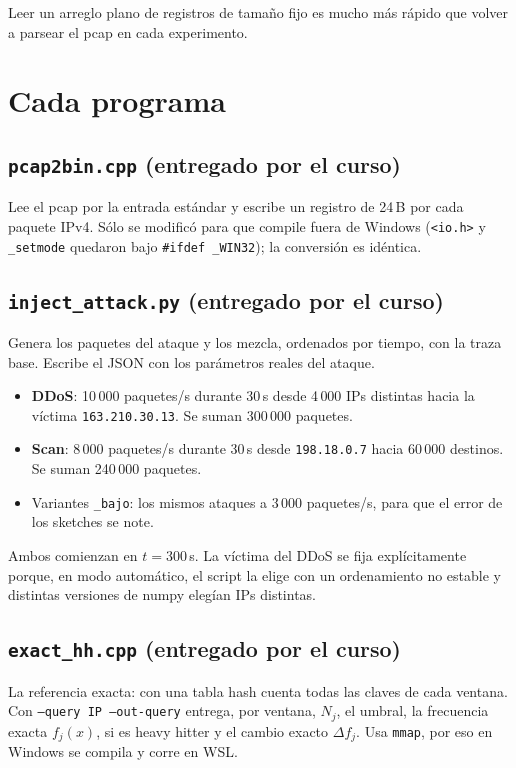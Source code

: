 \documentclass[11pt]{article}
\newcommand{\code}[1]{\texttt{#1}}
\begin{document}
Leer un arreglo plano de registros de tamaño fijo es mucho más rápido que volver a parsear el pcap en cada experimento.

\section{Cada programa}

\subsection{\code{pcap2bin.cpp} (entregado por el curso)}
Lee el pcap por la entrada estándar y escribe un registro de 24\,B por cada paquete IPv4. Sólo se modificó para que compile fuera de Windows (\code{<io.h>} y \code{\_setmode} quedaron bajo \code{\#ifdef \_WIN32}); la conversión es idéntica.

\subsection{\code{inject\_attack.py} (entregado por el curso)}
Genera los paquetes del ataque y los mezcla, ordenados por tiempo, con la traza base. Escribe el JSON con los parámetros reales del ataque.
\begin{itemize}
    \item \textbf{DDoS}: 10\,000 paquetes/s durante 30\,s desde 4\,000 IPs distintas hacia la víctima \code{163.210.30.13}. Se suman 300\,000 paquetes.
    \item \textbf{Scan}: 8\,000 paquetes/s durante 30\,s desde \code{198.18.0.7} hacia 60\,000 destinos. Se suman 240\,000 paquetes.
    \item Variantes \code{\_bajo}: los mismos ataques a 3\,000 paquetes/s, para que el error de los sketches se note.
\end{itemize}
Ambos comienzan en $t=300$\,s. La víctima del DDoS se fija explícitamente porque, en modo automático, el script la elige con un ordenamiento no estable y distintas versiones de numpy elegían IPs distintas.

\subsection{\code{exact\_hh.cpp} (entregado por el curso)}
La referencia exacta: con una tabla hash cuenta todas las claves de cada ventana. Con \code{--query IP --out-query} entrega, por ventana, $N_j$, el umbral, la frecuencia exacta $f_j(x)$, si es heavy hitter y el cambio exacto $\Delta f_j$. Usa \code{mmap}, por eso en Windows se compila y corre en WSL.
\end{document}
